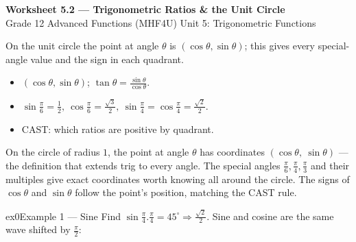\documentclass[11pt]{article}
\begin{document}
\begin{center}
{\LARGE\bfseries\color{titleblue}Worksheet 5.2 --- Trigonometric Ratios \& the Unit Circle}\\[2pt]
{\small Grade 12 Advanced Functions (MHF4U) \textperiodcentered{} Unit 5: Trigonometric Functions}
\end{center}

\begin{ideabox}
On the unit circle the point at angle $\theta$ is $(\cos\theta,\sin\theta)$; this gives every special-angle value and the sign in each quadrant.
\begin{itemize}[leftmargin=*,itemsep=2pt]
  \item $(\cos\theta,\sin\theta)$; $\tan\theta=\tfrac{\sin\theta}{\cos\theta}$.
  \item $\sin\tfrac{\pi}{6}=\tfrac12,\ \cos\tfrac{\pi}{6}=\tfrac{\sqrt3}{2},\ \sin\tfrac{\pi}{4}=\cos\tfrac{\pi}{4}=\tfrac{\sqrt2}{2}$.
  \item CAST: which ratios are positive by quadrant.
\end{itemize}
\end{ideabox}

\begin{learnbox}
On the circle of radius $1$, the point at angle $\theta$ has coordinates $(\cos\theta,\ \sin\theta)$ — the definition that extends trig to every angle.
The special angles $\tfrac{\pi}{6},\tfrac{\pi}{4},\tfrac{\pi}{3}$ and their multiples give exact coordinates worth knowing all around the circle.
The signs of $\cos\theta$ and $\sin\theta$ follow the point's position, matching the CAST rule.
\end{learnbox}


\begin{example}{ex0}{Example 1 --- Sine}
Find $\sin\tfrac{\pi}{4}$.\soln $\tfrac{\pi}{4}=45^\circ\Rightarrow\tfrac{\sqrt2}{2}$. Sine and cosine are the same wave shifted by $\tfrac{\pi}{2}$:\begin{center}\end{center}
\end{example}
\end{document}
